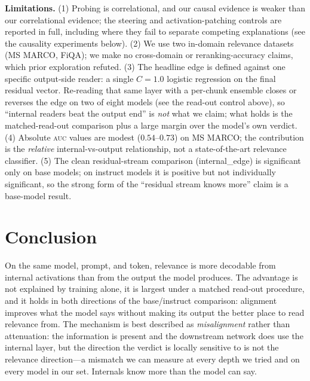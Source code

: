 \documentclass[11pt]{article}
\newcommand{\auc}{\textsc{auc}}
\begin{document}
\textbf{Limitations.} (1) Probing is correlational, and our causal evidence is
weaker than our correlational evidence; the steering and activation-patching
controls are reported in full, including where they fail to separate
competing explanations (see the causality experiments below). (2) We use two in-domain
relevance datasets (MS MARCO, FiQA); we make no cross-domain or
reranking-accuracy claims, which prior exploration refuted. (3) The headline
edge is defined against one specific output-side reader: a single
$C{=}1.0$ logistic regression on the final residual vector. Re-reading that
same layer with a per-chunk ensemble closes or reverses the edge on two of
eight models (see the read-out control above), so ``internal readers beat the
output end'' is \emph{not} what we claim; what holds is the matched-read-out
comparison plus a large margin over the model's own verdict. (4) Absolute
\auc{} values are modest ($0.54$--$0.73$) on MS MARCO; the contribution is the
\emph{relative} internal-vs-output relationship, not a state-of-the-art
relevance classifier. (5) The clean residual-stream comparison
(internal\_edge) is significant only on base models; on instruct models it is
positive but not individually significant, so the strong form of the ``residual
stream knows more'' claim is a base-model result.

\section{Conclusion}
On the same model, prompt, and token, relevance is more decodable from internal
activations than from the output the model produces. The advantage is not
explained by training alone, it is largest under a matched read-out procedure,
and it holds in both directions of the base/instruct comparison: alignment
improves what the model says without making its output the better place to
read relevance from. The mechanism is best described as \emph{misalignment}
rather than attenuation: the information is present and the downstream network
does use the internal layer, but the direction the verdict is locally sensitive
to is not the relevance direction---a mismatch we can measure at every depth we
tried and on every model in our set. Internals know more than the model can say.



\end{document}
